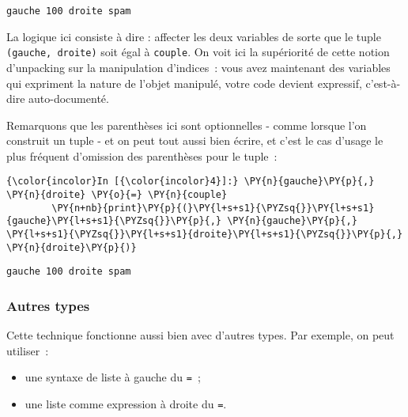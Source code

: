     \begin{Verbatim}[commandchars=\\\{\},frame=single,framerule=0.3mm,rulecolor=\color{cellframecolor}]
gauche 100 droite spam
\end{Verbatim}

    La logique ici consiste à dire : affecter les deux variables de sorte
que le tuple \texttt{(gauche,\ droite)} soit égal à \texttt{couple}. On
voit ici la supériorité de cette notion d'unpacking sur la manipulation
d'indices~: vous avez maintenant des variables qui expriment la nature
de l'objet manipulé, votre code devient expressif, c'est-à-dire
auto-documenté.

Remarquons que les parenthèses ici sont optionnelles - comme lorsque
l'on construit un tuple - et on peut tout aussi bien écrire, et c'est le
cas d'usage le plus fréquent d'omission des parenthèses pour le tuple~:

    \begin{Verbatim}[commandchars=\\\{\},frame=single,framerule=0.3mm,rulecolor=\color{cellframecolor}]
{\color{incolor}In [{\color{incolor}4}]:} \PY{n}{gauche}\PY{p}{,} \PY{n}{droite} \PY{o}{=} \PY{n}{couple}
        \PY{n+nb}{print}\PY{p}{(}\PY{l+s+s1}{\PYZsq{}}\PY{l+s+s1}{gauche}\PY{l+s+s1}{\PYZsq{}}\PY{p}{,} \PY{n}{gauche}\PY{p}{,} \PY{l+s+s1}{\PYZsq{}}\PY{l+s+s1}{droite}\PY{l+s+s1}{\PYZsq{}}\PY{p}{,} \PY{n}{droite}\PY{p}{)}
\end{Verbatim}


    \begin{Verbatim}[commandchars=\\\{\},frame=single,framerule=0.3mm,rulecolor=\color{cellframecolor}]
gauche 100 droite spam
\end{Verbatim}

    \hypertarget{autres-types}{%
\subsubsection{Autres types}\label{autres-types}}

    Cette technique fonctionne aussi bien avec d'autres types. Par exemple,
on peut utiliser~:

\begin{itemize}
\tightlist
\item
  une syntaxe de liste à gauche du \texttt{=}~;
\item
  une liste comme expression à droite du \texttt{=}.
\end{itemize}

